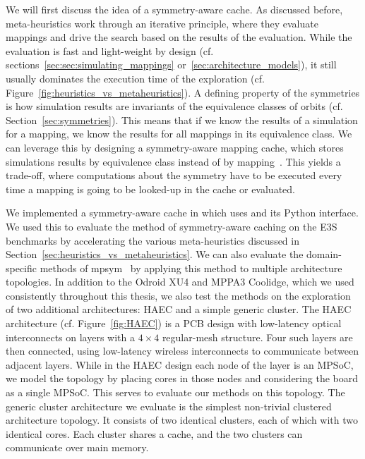 We will first discuss the idea of a symmetry-aware cache.
As discussed before, meta-heuristics work through an iterative principle, where they evaluate mappings and drive the search based on the results of the evaluation.
While the evaluation is fast and light-weight by design (cf. sections~\ref{sec:sec:simulating_mappings} or~\ref{sec:architecture_models}), it still usually dominates the execution time of the exploration (cf. Figure~\ref{fig:heuristics_vs_metaheuristics}).
A defining property of the symmetries is how simulation results are invariants of the equivalence classes of orbits (cf. Section~\ref{sec:symmetries}).
This means that if we know the results of a simulation for a mapping, we know the results for all mappings in its equivalence class.
We can leverage this by designing a symmetry-aware mapping cache, which stores simulations results by equivalence class instead of by mapping~\cite{goens_taco17}.
This yields a trade-off, where computations about the symmetry have to be executed every time a mapping is going to be looked-up in the cache or evaluated.

We implemented a symmetry-aware cache in \mocasin which uses \mpsym and its Python interface.
We used this to evaluate the method of symmetry-aware caching on the \ac{E3S} benchmarks by accelerating the various meta-heuristics discussed in Section~\ref{sec:heuristics_vs_metaheuristics}.
We can also evaluate the domain-specific methods of mpsym~\cite{goens_tcad21} by applying this method to multiple architecture topologies.
In addition to the Odroid XU4 and MPPA3 Coolidge, which we used consistently throughout this thesis, we also test the methods on the exploration of two additional architectures: \ac{HAEC} and a simple generic cluster.
The \ac{HAEC} architecture (cf. Figure~\ref{fig:HAEC}) is a \ac{PCB} design with low-latency optical interconnects on layers with a $4 \times 4$ regular-mesh structure.
Four such layers are then connected, using low-latency wireless interconnects to communicate between adjacent layers.
While in the \ac{HAEC} design each node of the layer is an \ac{MPSoC}, we model the topology by placing cores in those nodes and considering the board as a single \ac{MPSoC}.
This serves to evaluate our methods on this topology.
The generic cluster architecture we evaluate is the simplest non-trivial clustered architecture topology.
It consists of two identical clusters, each of which with two identical cores.
Each cluster shares a cache, and the two clusters can communicate over main memory.

